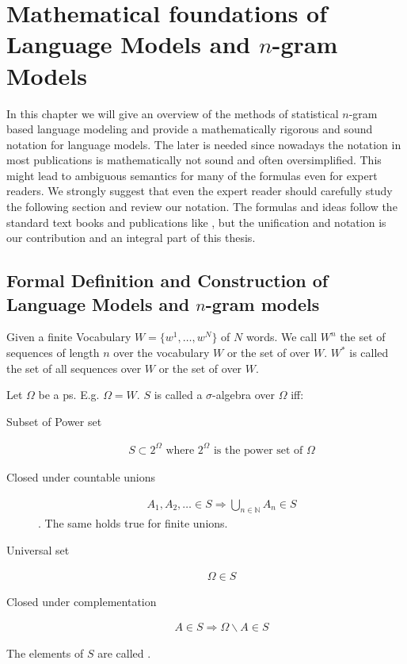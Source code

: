 \documentclass[•]{book}
\begin{document}
\chapter{Mathematical foundations of Language Models and $n$-gram Models}
In this chapter we will give an overview of the methods of statistical $n$-gram based language modeling and provide a mathematically rigorous and sound notation for language models.
The later is needed since nowadays the notation in most publications is mathematically not sound and often oversimplified.
This might lead to ambiguous semantics for many of the formulas even for expert readers. 
We strongly suggest that even the expert reader should carefully study the following section and review our notation. 
The formulas and ideas follow the standard text books and publications like \cite{chen:goodman},  but the unification and notation is our contribution and an integral part of this thesis. 


\section{Formal Definition and Construction of Language Models and $n$-gram models}\label{sec:basicDefinitions}
Given a finite Vocabulary $W = \{w^1,\dots,w^N\}$ of $N$ words. 
We call $W^{n}$ the set of sequences of length $n$ over the vocabulary $W$ or the set of  over $W$.
$W^{*}$ is called the set of all sequences over $W$ or the set of  over $W$.

\begin{definition}\label{def:sa}
Let $\Omega$ be a \gls{ps}. 
E.g. $\Omega=W$.
$S$ is called a $\sigma$-algebra over $\Omega$ iff:

\begin{description}
\item[Subset of Power set] 
\begin{align}
S\subset 2^{\Omega} \text{ where } 2^{\Omega} \text{ is the power set of } \Omega
\end{align} 
\item[Closed under countable unions] 
\begin{align}
A_1,A_2,\dots \in S \Rightarrow \bigcup_{n\in\mathbb{N}}A_n \in S \label{eq:closedUnion}
\end{align}. The same holds true for finite unions.
\item[Universal set] \begin{align}\Omega \in S \end{align}
\item[Closed under complementation] \begin{align} A\in S \Rightarrow \Omega\backslash A \in S \end{align}
\end{description}
\end{definition}
The elements of $S$ are called .
\end{document}
